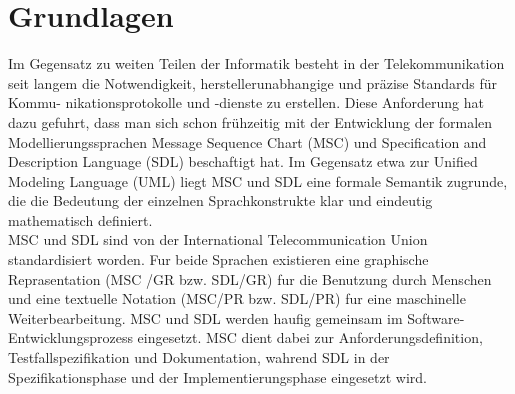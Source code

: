 

\chapter{Grundlagen}
Im Gegensatz zu weiten Teilen der Informatik besteht in der Telekommunikation seit langem die Notwendigkeit, herstellerunabhangige und präzise Standards für Kommu- nikationsprotokolle und -dienste zu erstellen. Diese Anforderung hat dazu gefuhrt, dass man sich schon frühzeitig mit der Entwicklung der formalen Modellierungssprachen Message Sequence Chart (MSC) und Specification and Description Language (SDL) beschaftigt hat. Im Gegensatz etwa zur Unified Modeling Language (UML) liegt MSC und SDL eine formale Semantik zugrunde, die die Bedeutung der einzelnen Sprachkonstrukte klar und eindeutig mathematisch definiert.\\
MSC und SDL sind von der International Telecommunication Union standardisiert worden. Fur beide Sprachen existieren eine graphische Reprasentation (MSC /GR bzw. SDL/GR) fur die Benutzung durch Menschen und eine textuelle Notation (MSC/PR bzw. SDL/PR) fur eine maschinelle Weiterbearbeitung. MSC und SDL werden haufig gemeinsam im Software-Entwicklungsprozess eingesetzt. MSC dient dabei zur Anforderungsdefinition, Testfallspezifikation und Dokumentation, wahrend SDL in der Spezifikationsphase und der Implementierungsphase eingesetzt wird.



